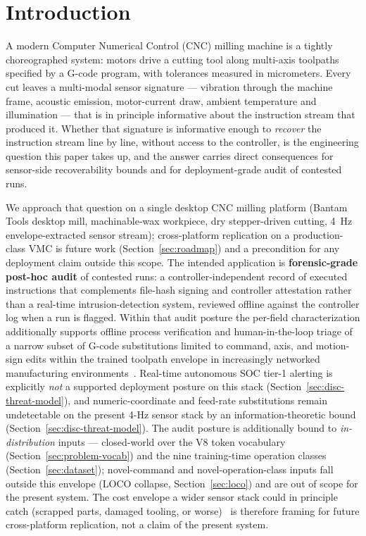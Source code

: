\documentclass[sensors,article,submit,moreauthors,pdftex]{Definitions/mdpi}
\begin{document}
\section{Introduction}
\label{sec:introduction}

A modern Computer Numerical Control (CNC) milling machine is a tightly choreographed system: motors drive a cutting tool along multi-axis toolpaths specified by a G-code program, with tolerances measured in micrometers. Every cut leaves a multi-modal sensor signature --- vibration through the machine frame, acoustic emission, motor-current draw, ambient temperature and illumination --- that is in principle informative about the instruction stream that produced it. Whether that signature is informative enough to \emph{recover} the instruction stream line by line, without access to the controller, is the engineering question this paper takes up, and the answer carries direct consequences for sensor-side recoverability bounds and for deployment-grade audit of contested runs.

We approach that question on a single desktop CNC milling platform (Bantam Tools desktop mill, machinable-wax workpiece, dry stepper-driven cutting, 4~Hz envelope-extracted sensor stream); cross-platform replication on a production-class VMC is future work (Section~\ref{sec:roadmap}) and a precondition for any deployment claim outside this scope. The intended application is \textbf{forensic-grade post-hoc audit} of contested runs: a controller-independent record of executed instructions that complements file-hash signing and controller attestation rather than a real-time intrusion-detection system, reviewed offline against the controller log when a run is flagged. Within that audit posture the per-field characterization additionally supports offline process verification and human-in-the-loop triage of a narrow subset of G-code substitutions limited to command, axis, and motion-sign edits within the trained toolpath envelope in increasingly networked manufacturing environments~\cite{nist2023sp80082,nist2024fmnet,sturm2014cyber,yampolskiy2018security,zhong2017intelligent,kimmell2025cnc}. Real-time autonomous SOC tier-1 alerting is explicitly \emph{not} a supported deployment posture on this stack (Section~\ref{sec:disc-threat-model}), and numeric-coordinate and feed-rate substitutions remain undetectable on the present 4-Hz sensor stack by an information-theoretic bound (Section~\ref{sec:disc-threat-model}). The audit posture is additionally bound to \emph{in-distribution} inputs --- closed-world over the V8 token vocabulary (Section~\ref{sec:problem-vocab}) and the nine training-time operation classes (Section~\ref{sec:dataset}); novel-command and novel-operation-class inputs fall outside this envelope (LOCO collapse, Section~\ref{sec:loco}) and are out of scope for the present system. The cost envelope a wider sensor stack could in principle catch (scrapped parts, damaged tooling, or worse)~\cite{teti2010advanced,serin2020tool} is therefore framing for future cross-platform replication, not a claim of the present system.
\end{document}

